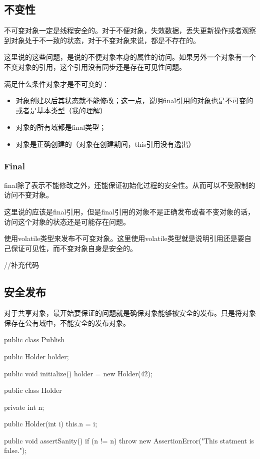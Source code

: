 \subsection{不变性}

不可变对象一定是线程安全的。对于不便对象，失效数据，丢失更新操作或者观察到对象处于不一致的状态，对于不变对象来说，都是不存在的。

这里说的这些问题，是说的不便对象本身的属性的访问。如果另外一个对象有一个不变对象的引用，这个引用没有同步还是存在可见性问题。

满足什么条件对象才是不可变的：
\begin{itemize}
\item 对象创建以后其状态就不能修改；这一点，说明final引用的对象也是不可变的或者是基本类型（我的理解）
\item 对象的所有域都是final类型；
\item 对象是正确创建的（对象在创建期间，this引用没有逸出）
\end{itemize}


\subsubsection{Final}

final除了表示不能修改之外，还能保证初始化过程的安全性。从而可以不受限制的访问不变对象。

这里说的应该是final引用，但是final引用的对象不是正确发布或者不变对象的话，访问这个对象的状态还是可能存在问题。


使用volatile类型来发布不可变对象。这里使用volatile类型就是说明引用还是要自己保证可见性，而不变对象自身是安全的。

\begin{Java}
//补充代码
\end{Java}

\subsection{安全发布}

对于共享对象，最开始要保证的问题就是确保对象能够被安全的发布。只是将对象保存在公有域中，不能安全的发布对象。

\begin{Java}
public class Publish {

	public Holder holder;
	
	public void initialize() {
		holder = new Holder(42);
	}
}

public class Holder {
	
	private int n;

	public Holder(int i) {
		this.n = i;
	}

	public void assertSanity() {
		if (n != n) {
			throw new AssertionError("This statment is false.");
		}
	}
}
\end{Java}

